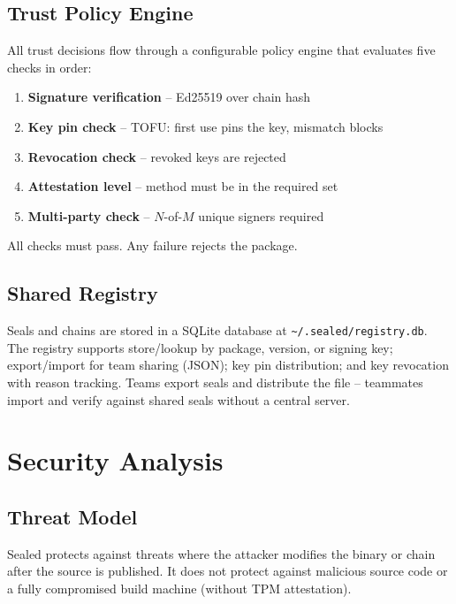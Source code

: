 \documentclass[11pt,a4paper]{article}
\begin{document}
\subsection{Trust Policy Engine}

All trust decisions flow through a configurable policy engine that evaluates five checks in order:

\begin{enumerate}
  \item \textbf{Signature verification} -- Ed25519 over chain hash
  \item \textbf{Key pin check} -- TOFU: first use pins the key, mismatch blocks
  \item \textbf{Revocation check} -- revoked keys are rejected
  \item \textbf{Attestation level} -- method must be in the required set
  \item \textbf{Multi-party check} -- $N$-of-$M$ unique signers required
\end{enumerate}

All checks must pass. Any failure rejects the package.

\subsection{Shared Registry}

Seals and chains are stored in a SQLite database at \texttt{\textasciitilde/.sealed/registry.db}. The registry supports store/lookup by package, version, or signing key; export/import for team sharing (JSON); key pin distribution; and key revocation with reason tracking. Teams export seals and distribute the file -- teammates import and verify against shared seals without a central server.

\section{Security Analysis}

\subsection{Threat Model}

Sealed protects against threats where the attacker modifies the binary or chain after the source is published. It does not protect against malicious source code or a fully compromised build machine (without TPM attestation).
\end{document}
